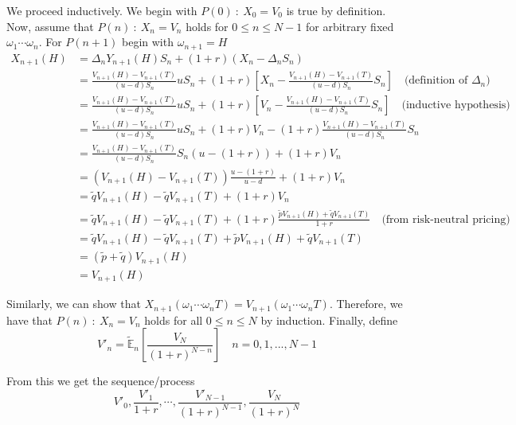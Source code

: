 \documentclass[12pt]{article}
\newlength\tindent
\renewcommand{\indent}{\hspace*{\tindent}}
\newcommand{\E}{\mathbb E}
\begin{document}
\indent We proceed inductively. We begin with $P(0)~:~X_0 = V_0$ is true by definition. Now, assume that $P(n)~:~X_n = V_n$ holds for $0 \leq n \leq N - 1$ for arbitrary fixed $\omega_1\cdots\omega_n$. For $P(n + 1)$ begin with $\omega_{n + 1} = H$
\begin{align*}
	X_{n + 1}(H) &= \Delta_nY_{n + 1}(H)S_n + (1 + r)(X_n - \Delta_nS_n) \\
	&= \frac{V_{n + 1}(H) - V_{n + 1}(T)}{(u - d)S_n}uS_n + (1 + r)\left[ X_n - \frac{V_{n + 1}(H) - V_{n + 1}(T)}{(u - d)S_n} S_n \right] \quad \text{(definition of $\Delta_n$)} \\
	&= \frac{V_{n + 1}(H) - V_{n + 1}(T)}{(u - d)S_n}uS_n + (1 + r)\left[ V_n - \frac{V_{n + 1}(H) - V_{n + 1}(T)}{(u - d)S_n} S_n \right] \quad \text{(inductive hypothesis)} \\
	&= \frac{V_{n + 1}(H) - V_{n + 1}(T)}{(u - d)S_n}uS_n + (1 + r)V_n - (1 + r)\frac{V_{n + 1}(H) - V_{n + 1}(T)}{(u - d)S_n} S_n \\
	&= \frac{V_{n + 1}(H) - V_{n + 1}(T)}{(u - d)S_n}S_n(u - (1 + r)) + (1 + r)V_n \\
	&= (V_{n + 1}(H) - V_{n + 1}(T)) \frac{u - (1 + r)}{u - d} + (1 + r)V_n \\
	&= \tilde{q}V_{n + 1}(H) - \tilde{q}V_{n + 1}(T) + (1 + r)V_n \\
	&= \tilde{q}V_{n + 1}(H) - \tilde{q}V_{n + 1}(T) + (1 + r)\frac{\tilde{p}V_{n + 1}(H) + \tilde{q}V_{n + 1}(T)}{1 + r} \quad \text{(from risk-neutral pricing)} \\
	&= \tilde{q}V_{n + 1}(H) - \tilde{q}V_{n + 1}(T) + \tilde{p}V_{n + 1}(H) + \tilde{q}V_{n + 1}(T) \\
	&= (\tilde{p} + \tilde{q})V_{n + 1}(H) \\
	&= V_{n + 1}(H)
\end{align*}

\indent Similarly, we can show that $X_{n + 1}(\omega_1\cdots\omega_n T) = V_{n + 1}(\omega_1\cdots\omega_n T)$. Therefore, we have that $P(n)~:~X_n = V_n$ holds for all $0 \leq n \leq N$ by induction. Finally, define
\begin{equation*}
	V'_n = \tilde{\E}_n \left[ \frac{V_N}{(1 + r)^{N - n}} \right] \quad  n = 0, 1, ..., N - 1
\end{equation*}

From this we get the sequence/process
\begin{equation*}
	V'_0, \frac{V'_1}{1 + r}, \cdots, \frac{V'_{N - 1}}{(1 + r)^{N - 1}}, \frac{V_N}{(1 + r)^N}
\end{equation*}
\end{document}
